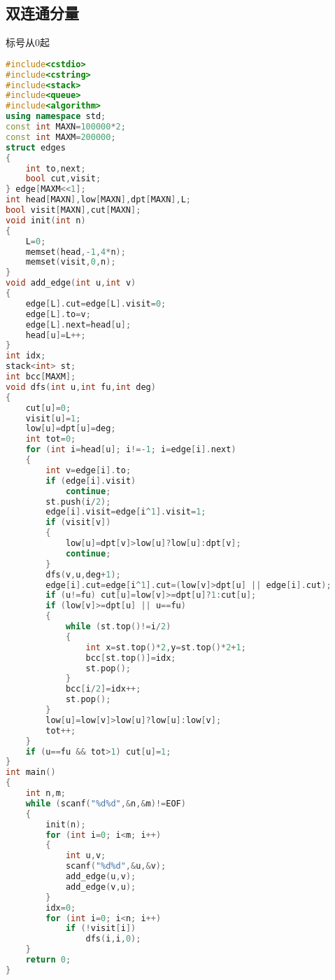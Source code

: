 \subsection{双连通分量}
	标号从$0$起
	\begin{lstlisting}[language=c++]
#include<cstdio>
#include<cstring>
#include<stack>
#include<queue>
#include<algorithm>
using namespace std;
const int MAXN=100000*2;
const int MAXM=200000;
struct edges
{
	int to,next;
	bool cut,visit;
} edge[MAXM<<1];
int head[MAXN],low[MAXN],dpt[MAXN],L;
bool visit[MAXN],cut[MAXN];
void init(int n)
{
	L=0;
	memset(head,-1,4*n);
	memset(visit,0,n);
}
void add_edge(int u,int v)
{
	edge[L].cut=edge[L].visit=0;
	edge[L].to=v;
	edge[L].next=head[u];
	head[u]=L++;
}
int idx;
stack<int> st;
int bcc[MAXM];
void dfs(int u,int fu,int deg)
{
	cut[u]=0;
	visit[u]=1;
	low[u]=dpt[u]=deg;
	int tot=0;
	for (int i=head[u]; i!=-1; i=edge[i].next)
	{
		int v=edge[i].to;
		if (edge[i].visit)
			continue;
		st.push(i/2);
		edge[i].visit=edge[i^1].visit=1;
		if (visit[v])
		{
			low[u]=dpt[v]>low[u]?low[u]:dpt[v];
			continue;
		}
		dfs(v,u,deg+1);
		edge[i].cut=edge[i^1].cut=(low[v]>dpt[u] || edge[i].cut);
		if (u!=fu) cut[u]=low[v]>=dpt[u]?1:cut[u];
		if (low[v]>=dpt[u] || u==fu)
		{
			while (st.top()!=i/2)
			{
				int x=st.top()*2,y=st.top()*2+1;
				bcc[st.top()]=idx;
				st.pop();
			}
			bcc[i/2]=idx++;
			st.pop();
		}
		low[u]=low[v]>low[u]?low[u]:low[v];
		tot++;
	}
	if (u==fu && tot>1) cut[u]=1;
}
int main()
{
	int n,m;
	while (scanf("%d%d",&n,&m)!=EOF)
	{
		init(n);
		for (int i=0; i<m; i++)
		{
			int u,v;
			scanf("%d%d",&u,&v);
			add_edge(u,v);
			add_edge(v,u);
		}
		idx=0;
		for (int i=0; i<n; i++)
			if (!visit[i])
				dfs(i,i,0);
	}
	return 0;
}
	\end{lstlisting}
